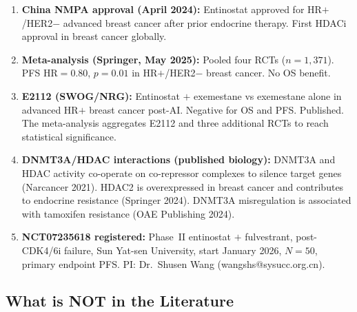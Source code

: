 \documentclass[12pt, a4paper]{article}
\begin{document}
\begin{enumerate}
    \item \textbf{China NMPA approval (April 2024):}
    Entinostat approved for HR$+$/HER2$-$ advanced
    breast cancer after prior endocrine therapy.
    First HDACi approval in breast cancer globally.

    \item \textbf{Meta-analysis (Springer, May 2025):}
    Pooled four RCTs ($n=1{,}371$). PFS HR$=0.80$,
    $p=0.01$ in HR$+$/HER2$-$ breast cancer. No OS
    benefit.

    \item \textbf{E2112 (SWOG/NRG):}
    Entinostat $+$ exemestane vs exemestane alone
    in advanced HR$+$ breast cancer post-AI. Negative
    for OS and PFS. Published. The meta-analysis
    aggregates E2112 and three additional RCTs to
    reach statistical significance.

    \item \textbf{DNMT3A/HDAC interactions
    (published biology):}
    DNMT3A and HDAC activity co-operate on
    co-repressor complexes to silence target genes
    (Narcancer 2021). HDAC2 is overexpressed in
    breast cancer and contributes to endocrine
    resistance (Springer 2024). DNMT3A
    misregulation is associated with tamoxifen
    resistance (OAE Publishing 2024).

    \item \textbf{NCT07235618 registered:}
    Phase~II entinostat $+$ fulvestrant, post-CDK4/6i
    failure, Sun Yat-sen University, start
    January 2026, $N=50$, primary endpoint PFS.
    PI: Dr.\ Shusen Wang (wangshs@sysucc.org.cn).
\end{enumerate}

\subsection{What is NOT in the Literature}
\end{document}
